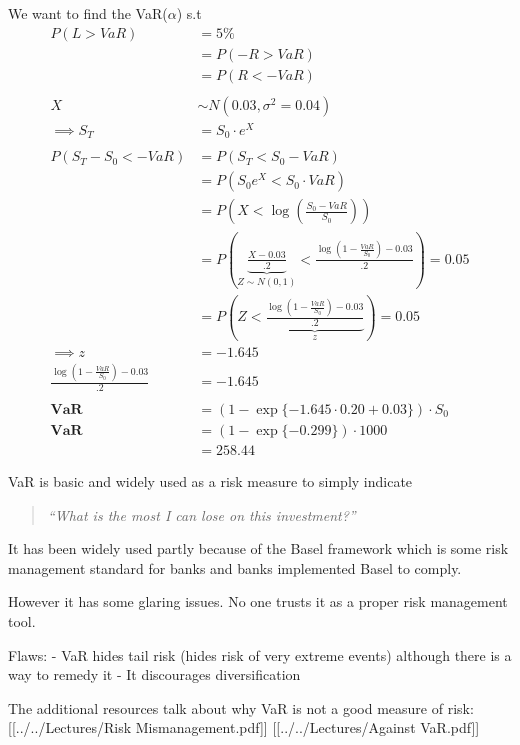 \documentclass[
  oneside]{book}
\begin{document}
We want to find the VaR(\(\alpha\)) s.t
\[
\begin{aligned}
P(L > VaR) &= 5\%\\
&= P(-R > VaR) \\
&= P(R < -VaR)\\
\\
X &\sim N(0.03, \sigma^{2}=0.04)\\
\implies S_{T} &= S_{0}\cdot e^{X}\\
\\
P(S_{T}-S_{0} < -VaR) &= P(S_{T} < S_{0}-VaR)\\
&= P(S_{0}e^{X} < S_{0}\cdot VaR)\\
&= P\left( X < \log\left( \frac{S_{0}-VaR}{S_{0}} \right)\right)\\
&= P\left( \underbrace{ \frac{X-0.03}{.2} }_{ Z\sim N(0,1) } < \frac{\log\left( 1-\frac{VaR}{S_{0}} \right)-0.03}{.2} \right) = 0.05\\
&= P\left( Z < \underbrace{ \frac{\log\left( 1-\frac{VaR}{S_{0}} \right)-0.03}{.2} }_{ z } \right) = 0.05\\
\implies z &= -1.645\\
\frac{\log\left( 1-\frac{VaR}{S_{0}} \right)-0.03}{.2} &= -1.645\\
\\
\mathbf{VaR} &= (1-\exp\{-1.645\cdot 0.20+0.03\}) \cdot S_{0}\\
\mathbf{VaR} &= (1-\exp\{-0.299\})\cdot 1000\\
&= \mathbf{258.44}
\end{aligned}
\]

VaR is basic and widely used as a risk measure to simply indicate

\begin{quote}
\emph{``What is the most I can lose on this investment?''}
\end{quote}

It has been widely used partly because of the Basel framework which is some risk management standard for banks and banks implemented Basel to comply.

However it has some glaring issues. No one trusts it as a proper risk management tool.

Flaws:
- VaR hides tail risk (hides risk of very extreme events) although there is a way to remedy it
- It discourages diversification

The additional resources talk about why VaR is not a good measure of risk:
{[}{[}../../Lectures/Risk Mismanagement.pdf{]}{]}
{[}{[}../../Lectures/Against VaR.pdf{]}{]}
\end{document}
